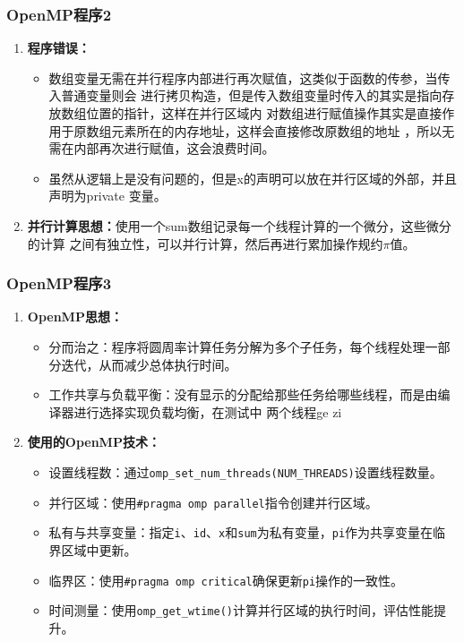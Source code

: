 \documentclass{article}
\begin{document}
\subsubsection{OpenMP程序2}
\begin{enumerate}
    \item \textbf{程序错误：}
    \begin{itemize}
        \item 数组变量无需在并行程序内部进行再次赋值，这类似于函数的传参，当传入普通变量则会
        进行拷贝构造，但是传入数组变量时传入的其实是指向存放数组位置的指针，这样在并行区域内
        对数组进行赋值操作其实是直接作用于原数组元素所在的内存地址，这样会直接修改原数组的地址
        ，所以无需在内部再次进行赋值，这会浪费时间。
        \item 虽然从逻辑上是没有问题的，但是x的声明可以放在并行区域的外部，并且声明为private
        变量。
    \end{itemize}
    \item \textbf{并行计算思想：}使用一个sum数组记录每一个线程计算的一个微分，这些微分的计算
    之间有独立性，可以并行计算，然后再进行累加操作规约$\pi$值。
\end{enumerate}
\subsubsection{OpenMP程序3}
\begin{enumerate}
    \item \textbf{OpenMP思想：}
    \begin{itemize}
        \item 分而治之：程序将圆周率计算任务分解为多个子任务，每个线程处理一部分迭代，从而减少总体执行时间。
        \item 工作共享与负载平衡：没有显示的分配给那些任务给哪些线程，而是由编译器进行选择实现负载均衡，在测试中
        两个线程ge zi
    \end{itemize}
    
    \item \textbf{使用的OpenMP技术：}
    \begin{itemize}
        \item 设置线程数：通过\texttt{omp\_set\_num\_threads(NUM\_THREADS)}设置线程数量。
        \item 并行区域：使用\texttt{\#pragma omp parallel}指令创建并行区域。
        \item 私有与共享变量：指定\texttt{i}、\texttt{id}、\texttt{x}和\texttt{sum}为私有变量，\texttt{pi}作为共享变量在临界区域中更新。
        \item 临界区：使用\texttt{\#pragma omp critical}确保更新\texttt{pi}操作的一致性。
        \item 时间测量：使用\texttt{omp\_get\_wtime()}计算并行区域的执行时间，评估性能提升。
    \end{itemize}
\end{enumerate}
\end{document}
